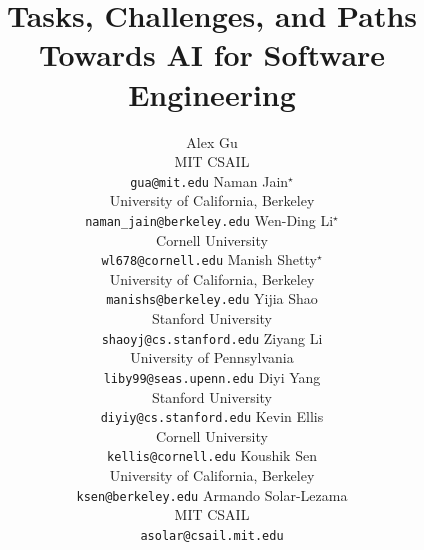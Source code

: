 \documentclass{article} %
\title{Tasks, Challenges, and Paths Towards AI for Software Engineering}
\author{
Alex Gu \\
MIT CSAIL \\
\texttt{gua@mit.edu}
\And
Naman Jain$^{\star}$ \\
University of California, Berkeley \\
\texttt{naman\_jain@berkeley.edu}
\And
Wen-Ding Li$^{\star}$ \\
Cornell University \\
\texttt{wl678@cornell.edu}
\And
Manish Shetty$^{\star}$ \\
University of California, Berkeley \\
\texttt{manishs@berkeley.edu}
\And
Yijia Shao \\
Stanford University \\
\texttt{shaoyj@cs.stanford.edu}
\And
Ziyang Li \\
University of Pennsylvania \\
\texttt{liby99@seas.upenn.edu}
\And
Diyi Yang \\
Stanford University \\
\texttt{diyiy@cs.stanford.edu}
\And
Kevin Ellis \\
Cornell University \\
\texttt{kellis@cornell.edu}
\And
Koushik Sen \\
University of California, Berkeley \\
\texttt{ksen@berkeley.edu}
\And
Armando Solar-Lezama \\
MIT CSAIL \\
\texttt{asolar@csail.mit.edu}
}
\begin{document}
\maketitle

\vspace{-0.5cm}

\begin{abstract}

\end{abstract}










\end{document}
